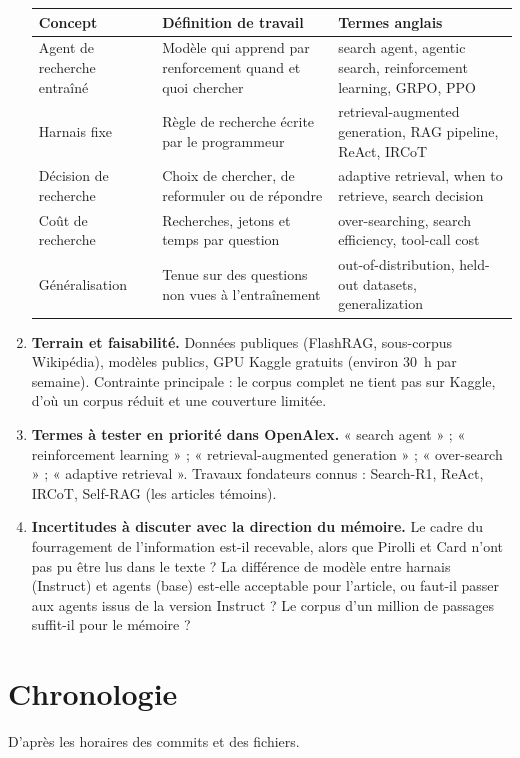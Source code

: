 \documentclass[10pt,a4paper]{article}
\begin{document}
\begin{enumerate}
\smallskip
\small
\begin{tabular}{@{}P{3.1cm}P{5.4cm}P{6.6cm}@{}}
\toprule
Concept & Définition de travail & Termes anglais\\
\midrule
Agent de recherche entraîné & Modèle qui apprend par renforcement quand et quoi chercher & search agent, agentic search, reinforcement learning, GRPO, PPO\\
Harnais fixe & Règle de recherche écrite par le programmeur & retrieval-augmented generation, RAG pipeline, ReAct, IRCoT\\
Décision de recherche & Choix de chercher, de reformuler ou de répondre & adaptive retrieval, when to retrieve, search decision\\
Coût de recherche & Recherches, jetons et temps par question & over-searching, search efficiency, tool-call cost\\
Généralisation & Tenue sur des questions non vues à l'entraînement & out-of-distribution, held-out datasets, generalization\\
\bottomrule
\end{tabular}
\normalsize
\smallskip

\item \textbf{Terrain et faisabilité.} Données publiques (FlashRAG, sous-corpus Wikipédia), modèles publics, GPU Kaggle gratuits (environ 30~h par semaine). Contrainte principale : le corpus complet ne tient pas sur Kaggle, d'où un corpus réduit et une couverture limitée.
\item \textbf{Termes à tester en priorité dans OpenAlex.} « search agent » ; « reinforcement learning » ; « retrieval-augmented generation » ; « over-search » ; « adaptive retrieval ». Travaux fondateurs connus : Search-R1, ReAct, IRCoT, Self-RAG (les articles témoins).
\item \textbf{Incertitudes à discuter avec la direction du mémoire.} Le cadre du fourragement de l'information est-il recevable, alors que Pirolli et Card n'ont pas pu être lus dans le texte ? La différence de modèle entre harnais (Instruct) et agents (base) est-elle acceptable pour l'article, ou faut-il passer aux agents issus de la version Instruct ? Le corpus d'un million de passages suffit-il pour le mémoire ?
\end{enumerate}

\section{Chronologie}

D'après les horaires des commits et des fichiers.
\end{document}
